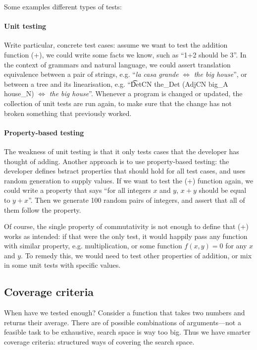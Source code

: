Some examples different types of tests:

\paragraph{Unit testing}

Write particular, concrete test cases: assume we want to test the
addition function (+), we could write some facts we know, such as
``1+2 should be 3''. In the context of grammars and natural language,
we could assert translation equivalence between a pair of strings,
e.g. ``\emph{la casa grande} $\Leftrightarrow$ \emph{the big house}'',
or between a tree and its linearisation, e.g. ``\t{DetCN the\_Det
  (AdjCN  big\_A house\_N)} $\Leftrightarrow$ \emph{the big house}''.
Whenever a program is changed or updated, the collection of unit tests
are run again, to make sure that the change has not broken something
that previously worked.

\paragraph{Property-based testing}

The weakness of unit testing is that it only tests cases that the
developer has thought of adding. Another approach is to use
property-based testing: the developer defines bstract properties that
should hold for all test cases, and uses random generation to supply
values. If we want to test the (+) function again, we could write a
property that says ``for all integers $x$ and $y$, $x+y$ should be
equal to $y+x$''. Then we generate 100 random pairs of integers, and
assert that all of them follow the property. 

Of course, the single property of commutativity is not enough to
define that (+) works as intended: if that were the only test, it
would happily pass any function with similar property,
e.g. multiplication, or some function $f(x, y) = 0$ for any $x$
and $y$. To remedy this, we would need to test other properties of
addition, or mix in some unit tests with specific values.


\subsection{Coverage criteria}

When have we tested enough? Consider a function that takes two numbers
and returns their average. There are  of possible
combinations of arguments---not a feasible task to be
exhaustive, search space is way too big. Thus we have smarter coverage
criteria: structured ways of covering the search space.

